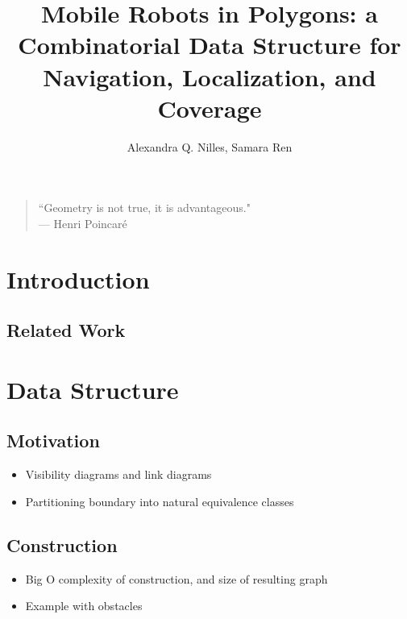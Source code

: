 \documentclass[letterpaper, 10 pt, conference]{ieeeconf}  %
\title{Mobile Robots in Polygons: a Combinatorial Data Structure for
Navigation, Localization, and Coverage}
\author{Alexandra Q. Nilles, Samara Ren%
}
\begin{document}
\maketitle

%

{\small
\begin{center}
\begin{quotation}
``Geometry is not true, it is advantageous." \\
\hfill    --- Henri Poincar\'e
\end{quotation}
\end{center}
}

\section{Introduction} 


\subsection{Related Work}

\section{Data Structure}

\subsection{Motivation}

\begin{itemize}
\item Visibility diagrams and link diagrams
\item Partitioning boundary into natural equivalence classes
\end{itemize}

\subsection{Construction}

\begin{itemize}
\item Big O complexity of construction, and size of resulting graph
\item Example with obstacles
\end{itemize}
\end{document}
